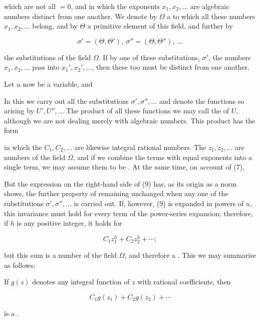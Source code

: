 which are not all $=0$, and in which the exponents $x_1, x_2, \ldots$ are algebraic numbers distinct from one another. We denote by $\Omega$ a  to which all these numbers $x_1, x_2, \ldots$ belong, and by $\Theta$ a primitive element of this field, and further by

\[
\sigma' = (\Theta,\Theta'),\ \sigma'' = (\Theta,\Theta''),\ \ldots
\]

the substitutions of the field $\Omega$. If by one of these substitutions, $\sigma'$, the numbers $x_1, x_2, \ldots$ pass into $x_1', x_2', \ldots$, then these too must be distinct from one another.

Let $u$ now be a variable, and


In this we carry out all the substitutions $\sigma', \sigma'', \ldots$ and denote the functions so arising by $U', U'', \ldots$ The product of all these functions we may call the  of $U$, although we are not dealing merely with algebraic numbers. This product has the form


in which the $C_1, C_2, \ldots$ are likewise integral rational numbers. The $z_1, z_2, \ldots$ are numbers of the field $\Omega$, and if we combine the terms with equal exponents into a single term, we may assume them to be . At the same time, on account of (7),


But the expression on the right-hand side of (9) has, as its origin as a norm shows, the further property of remaining unchanged when any one of the substitutions $\sigma', \sigma'', \ldots$ is carried out. If, however, (9) is expanded in powers of $u$, this invariance must hold for every term of the power-series expansion; therefore, if $h$ is any positive integer, it holds for

\[
C_1z_1^h+C_2z_2^h+\cdots;
\]

but this sum is a number of the field $\Omega$, and therefore a . This we may summarise as follows:

If $g(z)$ denotes any integral function of $z$ with rational coefficients, then

\[
C_1g(z_1)+C_2g(z_2)+\cdots
\]

is a .

